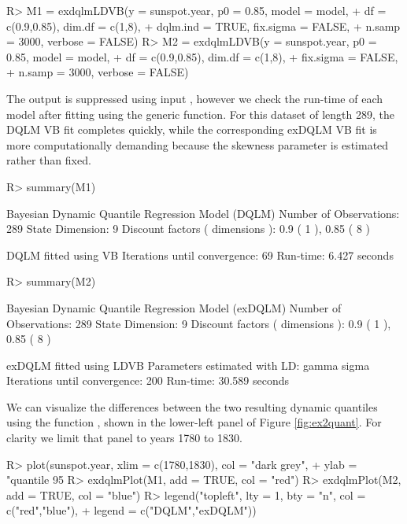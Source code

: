 \documentclass[jss]{jss}
\begin{document}
\begin{CodeChunk}
\begin{CodeInput}
R> M1 = exdqlmLDVB(y = sunspot.year, p0 = 0.85, model = model,
+                  df = c(0.9,0.85), dim.df = c(1,8),
+                  dqlm.ind = TRUE, fix.sigma = FALSE,
+                  n.samp = 3000, verbose = FALSE)     
R> M2 = exdqlmLDVB(y = sunspot.year, p0 = 0.85, model = model,
+                  df = c(0.9,0.85), dim.df = c(1,8),
+                  fix.sigma = FALSE,
+                  n.samp = 3000, verbose = FALSE)  
\end{CodeInput}
\end{CodeChunk}

The output is suppressed using input , however we check the run-time of each model after fitting using the  generic function. For this dataset of length 289, the DQLM VB fit completes quickly, while the corresponding exDQLM VB fit is more computationally demanding because the skewness parameter is estimated rather than fixed.

\begin{CodeChunk}
\begin{CodeInput}
R> summary(M1)
\end{CodeInput}
\begin{CodeOutput}
Bayesian Dynamic Quantile Regression Model (DQLM)
Number of Observations: 289 
State Dimension: 9 
Discount factors ( dimensions ): 0.9 ( 1 ), 0.85 ( 8 ) 
 
DQLM fitted using VB
Iterations until convergence: 69 
Run-time: 6.427 seconds
\end{CodeOutput}
\begin{CodeInput}
R> summary(M2)
\end{CodeInput}
\begin{CodeOutput}
Bayesian Dynamic Quantile Regression Model (exDQLM)
Number of Observations: 289 
State Dimension: 9 
Discount factors ( dimensions ): 0.9 ( 1 ), 0.85 ( 8 ) 
 
exDQLM fitted using LDVB
Parameters estimated with LD: gamma sigma  
Iterations until convergence: 200 
Run-time: 30.589 seconds
\end{CodeOutput}
\end{CodeChunk}



We can visualize the differences between the two resulting dynamic quantiles using the function , shown in the lower-left panel of Figure \ref{fig:ex2quant}. For clarity we limit that panel to years 1780 to 1830.
\begin{CodeChunk}
\begin{CodeInput}
R> plot(sunspot.year, xlim = c(1780,1830), col = "dark grey",
+       ylab = "quantile 95%
R> exdqlmPlot(M1, add = TRUE, col = "red")
R> exdqlmPlot(M2, add = TRUE, col = "blue")
R> legend("topleft", lty = 1, bty = "n", col = c("red","blue"),
+        legend = c("DQLM","exDQLM"))
\end{CodeInput}
\end{CodeChunk}
\end{document}
